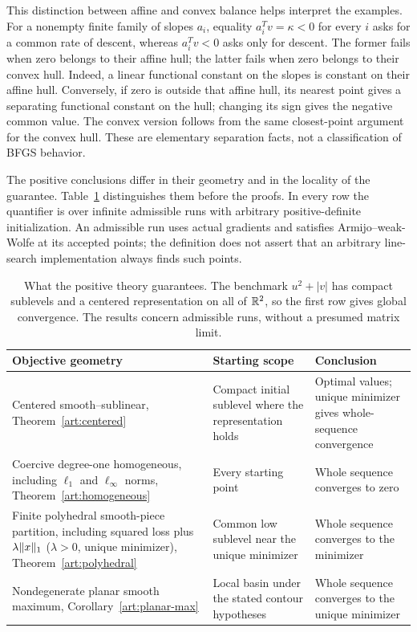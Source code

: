 This distinction between affine and convex balance helps interpret the
examples. For a nonempty finite family of slopes $a_i$, equality $a_i^Tv=\kappa<0$ for every $i$ asks
for a common rate of descent, whereas $a_i^Tv<0$ asks only for descent.
The former fails when zero belongs to their affine hull; the latter fails
when zero belongs to their convex hull. Indeed, a linear functional constant
on the slopes is constant on their affine hull. Conversely, if zero is
outside that affine hull, its nearest point gives a separating functional
constant on the hull; changing its sign gives the negative common value.
The convex version follows from the same closest-point argument for the
convex hull. These are elementary separation facts, not a classification
of BFGS behavior.

The positive conclusions differ in their geometry and in the locality of the
guarantee. Table~\ref{art:positive-outcomes} distinguishes them before the
proofs. In every row the quantifier is over infinite admissible runs with
arbitrary positive-definite initialization. An admissible run uses actual
gradients and satisfies Armijo--weak-Wolfe at its accepted points; the definition does not
assert that an arbitrary line-search implementation always finds such points.

\begin{table}[tbp]
\centering
\begin{tabular}{@{}>{\raggedright\arraybackslash}p{}>{\raggedright\arraybackslash}p{}>{\raggedright\arraybackslash}p{}@{}}
\toprule
Objective geometry & Starting scope & Conclusion\\
\midrule
Centered smooth--sublinear, Theorem~\ref{art:centered}
& Compact initial sublevel where the representation holds
& Optimal values; unique minimizer gives whole-sequence convergence\\\addlinespace
Coercive degree-one homogeneous, including $\ell_1$ and $\ell_\infty$ norms,
Theorem~\ref{art:homogeneous}
& Every starting point
& Whole sequence converges to zero\\\addlinespace
Finite polyhedral smooth-piece partition, including squared loss plus
$\lambda\lVert x\rVert_1$ ($\lambda>0$, unique minimizer), Theorem~\ref{art:polyhedral}
& Common low sublevel near the unique minimizer
& Whole sequence converges to the minimizer\\\addlinespace
Nondegenerate planar smooth maximum, Corollary~\ref{art:planar-max}
& Local basin under the stated contour hypotheses
& Whole sequence converges to the unique minimizer\\
\bottomrule
\end{tabular}
\caption{What the positive theory guarantees. The benchmark $u^2+|v|$ has
compact sublevels and a centered representation on all of $\mathbb R^2$, so the first
row gives global convergence.
The results concern admissible runs, without a presumed matrix limit.}
\label{art:positive-outcomes}
\end{table}

